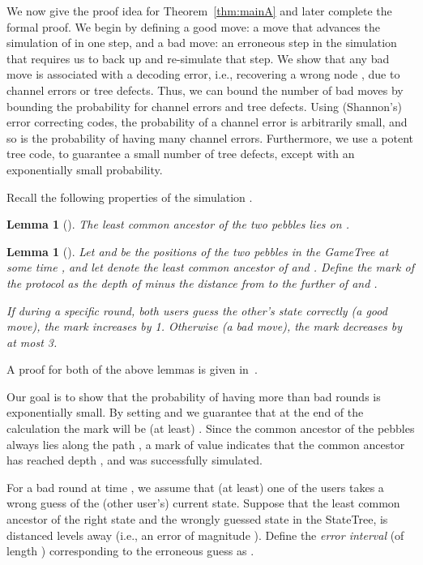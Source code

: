 \documentclass[ letterpaper, 11pt]{article}
\newtheorem{lemma}[theorem]{Lemma}
\newcommand{\gametree}{\textsf{GameTree}\xspace}
\newcommand{\statetree}{{\textsf{StateTree}}\xspace}
\newcommand{\potent}{potent\xspace}
\begin{document}
We now give the proof idea  for Theorem~\ref{thm:mainA} and later complete the formal proof.
We begin by defining a good move: a move that advances the simulation of  in one step,
and a bad move: an erroneous step in the simulation that requires us to back up and re-simulate
that step. We show that any bad move is associated with a decoding error,
i.e., recovering a wrong node , due to channel errors or tree defects.
Thus, we can bound the number of bad moves by bounding the probability for
channel errors and tree defects.
Using (Shannon's) error correcting codes, the probability of a channel error is arbitrarily small,
and so is the probability of having many channel errors.
Furthermore, we use a \potent tree code, to guarantee
a small number of tree defects, except with an exponentially small probability.



\vspace{1em}




Recall the following properties of the simulation .
\begin{lemma}[\cite{schulman96}] \label{lem:lcaOnTrack}
The least common ancestor of the two pebbles lies on .
\end{lemma}
\begin{lemma}[\cite{schulman96}]\label{lem:moves}
Let  and  be the positions of the two pebbles in the \gametree at some time ,
and let  denote the least common ancestor of  and .
Define the {\em mark} of the protocol as the depth of  minus the
distance from  to the further of  and .

If during a specific round, both users guess the other's state correctly
(a {\em good} move), the mark increases by 1.
Otherwise (a {\em bad} move), the mark decreases by at most 3.
\end{lemma}
\noindent A proof for  both of the above lemmas is given in~\cite{schulman96}.

Our goal is to show that the probability of having more than  bad rounds
is exponentially small. By setting  and  we guarantee
that  at the end of the calculation the mark will be (at least) .
Since the common ancestor of the pebbles always lies along the path ,
a mark of value   indicates that the common ancestor has reached depth ,
and  was successfully simulated.

For a bad round at time , we assume that (at least) one of the users takes a wrong
guess of the (other user's) current state.
Suppose that
the least common ancestor of the right state and
the wrongly guessed state in the \statetree, is distanced  levels away (i.e., an error of magnitude ).
Define the {\em error interval} (of length ) corresponding to the erroneous guess
as  .
\end{document}
